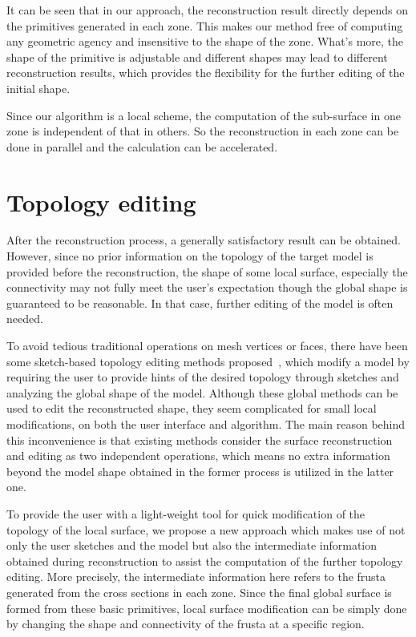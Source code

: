 It can be seen that in our  approach, the reconstruction result
directly depends on the primitives generated in each zone. This
makes our method free of computing any geometric agency and
insensitive to the shape of the zone. What's more, the shape of the
primitive is adjustable and different shapes may lead to different
reconstruction results, which provides the flexibility for the
further editing of the initial shape.

Since our algorithm is a local scheme, the  computation of the
sub-surface in one zone is independent of that in others. So the
reconstruction in each zone can be done in parallel and the
calculation can be accelerated.



\section{Topology editing}
\label{ch6:sec:edit}

After the reconstruction  process, a generally satisfactory result
can be obtained. However, since no prior information on the topology
of the target model is provided before the reconstruction, the shape
of some local surface, especially the connectivity may not fully
meet the user's expectation though the global shape is guaranteed to
be reasonable. In that case, further editing of the model is often
needed.

To avoid tedious traditional  operations on mesh vertices or faces,
there have been some sketch-based topology editing methods
proposed~\cite{HRABV11,JT09,JZH07}, which modify a model by
requiring the user to provide hints of the desired topology through
sketches and analyzing the global shape of the model. Although these
global methods can be used to edit the reconstructed shape, they
seem complicated for small local modifications, on both the user
interface and algorithm. The main reason behind this inconvenience
is that existing methods consider the surface reconstruction and
editing as two independent operations, which means no extra
information beyond the model shape obtained in the former process is
utilized in the latter one.

To provide the user with a light-weight tool for quick modification of
the topology of the local surface, we propose a new approach which
makes use of not only the user sketches and the model but also the
intermediate information obtained during reconstruction to assist
the computation of the further topology editing. More precisely, the
intermediate information here refers to the frusta generated from
the cross sections in each zone. Since the final global surface is
formed from these basic primitives, local surface modification can
be simply done by changing the shape and connectivity of the frusta
at a specific region.

